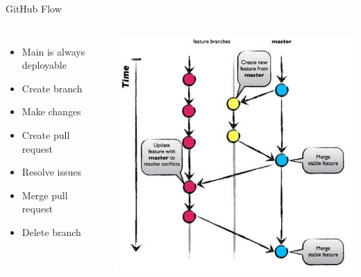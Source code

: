 \documentclass{slide}
\begin{document}
\begin{frame}{GitHub Flow \cite{github-flow}}
    \vspace{1pt}
    \begin{columns}
      {\LARGE
        \vspace{-5mm}
        \begin{itemize}
            \item { Main is always deployable\\}
            \item Create branch
            \item Make changes
            \item Create pull request
            \item Resolve issues
            \item Merge pull request
            \item Delete branch
        \end{itemize}
      }
        \centering
        \includegraphics[height=0.93\textheight]{diagrams/github-flow.jpeg}
    \end{columns}
\end{frame}
\end{document}
